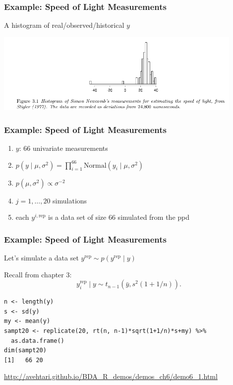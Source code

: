 \documentclass{beamer}
\begin{document}
\begin{frame}
\frametitle{Example: Speed of Light Measurements}

A histogram of real/observed/historical $y$
\begin{center}
\includegraphics[width=120mm]{speed_light_data.png}
\end{center}

\end{frame}


\begin{frame}
\frametitle{Example: Speed of Light Measurements}

\begin{enumerate}
\item $y$: $66$ univariate measurements 
\item $p(y \mid \mu, \sigma^2) = \prod_{i=1}^{66}\text{Normal}(y_i \mid \mu, \sigma^2)$
\item $p(\mu, \sigma^2) \propto \sigma^{-2}$
\item $j = 1, \ldots, 20$ simulations
\item each $y^{i, \text{rep}}$ is a data set of size $66$ simulated from the ppd
\end{enumerate}


\end{frame}




\begin{frame}[fragile]
\frametitle{Example: Speed of Light Measurements}

Let's simulate a data set $y^{\text{rep}} \sim p(y^{\text{rep}} \mid y)$
\newline

Recall from chapter 3:
\[
y^{\text{rep}}_i \mid y \sim t_{n-1}(\bar{y}, s^2(1 + 1/n)).
\]

\begin{verbatim}
n <- length(y)
s <- sd(y)
my <- mean(y)
sampt20 <- replicate(20, rt(n, n-1)*sqrt(1+1/n)*s+my) %>%
  as.data.frame()
dim(sampt20)
[1]   66 20
\end{verbatim}
\url{http://avehtari.github.io/BDA_R_demos/demos_ch6/demo6_1.html}
\end{frame}
\end{document}

